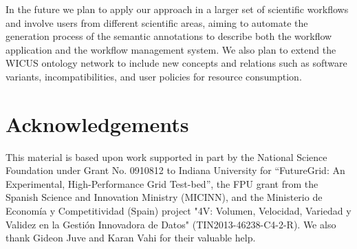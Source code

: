 \documentclass[final,5p,times,twocolumn]{elsarticle}
\begin{document}
In the future we plan to apply our approach in a larger set of scientific workflows and involve users from different scientific areas, aiming to automate the generation process of the semantic annotations to describe both the workflow application and the workflow management system. We also plan to extend the WICUS ontology network to include new concepts and relations such as software variants, incompatibilities, and user policies for resource consumption.



\section*{Acknowledgements}

This material is based upon work supported in part by the National Science Foundation under Grant No. 0910812 to Indiana University for ``FutureGrid: An Experimental, High-Performance Grid Test-bed'', the FPU grant from the Spanish Science and Innovation Ministry (MICINN), and the Ministerio de Econom\'ia y Competitividad (Spain) project "4V: Volumen, Velocidad, Variedad y Validez en la Gesti\'on Innovadora de Datos" (TIN2013-46238-C4-2-R). We also thank Gideon Juve and Karan Vahi for their valuable help.




\end{document}
